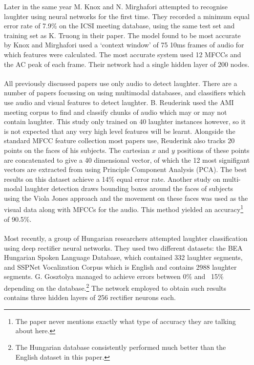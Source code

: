 \documentclass[a4paper,11pt,notitlepage]{article}
\begin{document}
Later in the same year M. Knox and N. Mirghafori attempted to recognise laughter using neural networks for the first time\cite{knox2007automatic}. They recorded a minimum equal error rate of 7.9\% on the ICSI meeting database, using the same test set and training set as K. Truong in their paper\cite{truong2007automatic}. The model found to be most accurate by Knox and Mirghafori used a `context window' of 75 10ms frames of audio for which features were calculated. The most accurate system used 12 MFCCs and the AC peak of each frame. Their network had a single hidden layer of 200 nodes.\\
\\
All previously discussed papers use only audio to detect laughter. There are a number of papers focussing on using multimodal databases, and classifiers which use audio and visual features to detect laughter. B. Reuderink\cite{petridis2008fusion,reuderink2008decision} used the AMI meeting corpus to find and classify chunks of audio which may or may not contain laughter. This study only trained on 40 laughter instances however, so it is not expected that any very high level features will be learnt.\cite{petridis2008audiovisual} Alongside the standard MFCC feature collection most papers use, Reuderink also tracks 20 points on the faces of his subjects. The cartesian $x$ and $y$ positions of these points are concatenated to give a 40 dimensional vector, of which the 12 most signifigant vectors are extracted from using Principle Component Analysis (PCA). The best results on this dataset achieve a 14\% equal error rate. Another study on multi-modal laughter detection draws bounding boxes around the faces of subjects using the Viola Jones approach and the movement on these faces was used as the visual data along with MFCCs for the audio.\cite{scherer2009multimodal} This method yielded an accuracy\footnote{The paper never mentions exactly what type of accuracy they are talking about here.} of 90.5\%.\\
\\
Most recently, a group of Hungarian researchers attempted laughter classification using deep rectifier neural networks\cite{gosztolya2016laughter}. They used two different datasets: the BEA Hungarian Spoken Language Database, which contained 332 laughter segments, and SSPNet Vocalization Corpus which is English and contains 2988 laughter segments. G. Gosztolya managed to achieve errors between 0\% and ~15\% depending on the database.\footnote{The Hungarian database consistently performed much better than the English dataset in this paper.} The network employed to obtain such results contains three hidden layers of 256 rectifier neurons each.
\end{document}
